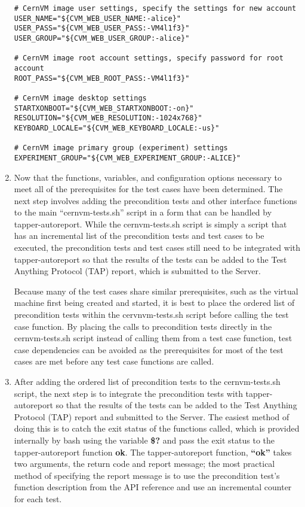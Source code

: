 \begin{enumerate}
\begin{lstlisting}
# CernVM image user settings, specify the settings for new account
USER_NAME="${CVM_WEB_USER_NAME:-alice}"
USER_PASS="${CVM_WEB_USER_PASS:-VM4l1f3}"
USER_GROUP="${CVM_WEB_USER_GROUP:-alice}"

# CernVM image root account settings, specify password for root account
ROOT_PASS="${CVM_WEB_ROOT_PASS:-VM4l1f3}"

# CernVM image desktop settings
STARTXONBOOT="${CVM_WEB_STARTXONBOOT:-on}"
RESOLUTION="${CVM_WEB_RESOLUTION:-1024x768}"
KEYBOARD_LOCALE="${CVM_WEB_KEYBOARD_LOCALE:-us}"

# CernVM image primary group (experiment) settings
EXPERIMENT_GROUP="${CVM_WEB_EXPERIMENT_GROUP:-ALICE}"
\end{lstlisting}
			
\item	Now that the functions, variables, and configuration options necessary to meet all of the prerequisites for 
			the \cernvm test cases have been determined. The next step involves adding the precondition tests and 
			other interface functions to the main ``cernvm-tests.sh'' script in a form that can be handled by 
			tapper-autoreport. While the cernvm-tests.sh script is simply a script that has an incremental list of the 
			precondition tests and test cases to be executed, the precondition tests and test cases still need to be
			integrated with tapper-autoreport so that the results of the tests can be added to the Test Anything Protocol
			(TAP) report, which is submitted to the \tapper Server.
			
			Because many of the test cases share similar prerequisites, such as the virtual machine first being created and
			started, it is best to place the ordered list of precondition tests within the cervnvm-tests.sh script before calling
			the test case function. By placing the calls to precondition tests directly in the cernvm-tests.sh script instead
			of calling them from a test case function, test case dependencies can be avoided as the prerequisites for most
			of the \cernvm test cases are met before any test case functions are called.
			
\item	After adding the ordered list of precondition tests to the cernvm-tests.sh script, the next step is to integrate
			the precondition tests with tapper-autoreport so that the results of the tests can be added to the Test Anything 
			Protocol (TAP) report and submitted to the \tapper Server. The easiest method of doing this is to catch the exit
			status of the functions called, which is provided internally by bash using the variable {\bf \$?} and pass the exit
			status to the tapper-autoreport function {\bf ok}. The tapper-autoreport function, {\bf ``ok''} takes two arguments,
			the return code and report message; the most practical method of specifying the report message is to use
			the precondition test's function description from the API reference and use an incremental counter for each test.
			

\end{enumerate}

